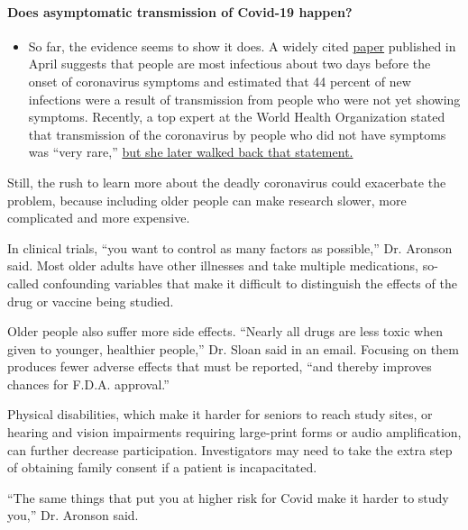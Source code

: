 \begin{itemize}
{  \paragraph{Does asymptomatic transmission of Covid-19
  happen?}\label{does-asymptomatic-transmission-of-covid-19-happen}}

  \begin{itemize}
  \tightlist
  \item
    So far, the evidence seems to show it does. A widely cited
    \href{https://www.nature.com/articles/s41591-020-0869-5}{paper}
    published in April suggests that people are most infectious about
    two days before the onset of coronavirus symptoms and estimated that
    44 percent of new infections were a result of transmission from
    people who were not yet showing symptoms. Recently, a top expert at
    the World Health Organization stated that transmission of the
    coronavirus by people who did not have symptoms was ``very rare,''
    \href{https://www.nytimes3xbfgragh.onion/2020/06/09/world/coronavirus-updates.html?action=click\&pgtype=Article\&state=default\&region=MAIN_CONTENT_3\&context=storylines_faq\#link-1f302e21}{but
    she later walked back that statement.}
  \end{itemize}
\end{itemize}

Still, the rush to learn more about the deadly coronavirus could
exacerbate the problem, because including older people can make research
slower, more complicated and more expensive.

In clinical trials, ``you want to control as many factors as possible,''
Dr. Aronson said. Most older adults have other illnesses and take
multiple medications, so-called confounding variables that make it
difficult to distinguish the effects of the drug or vaccine being
studied.

Older people also suffer more side effects. ``Nearly all drugs are less
toxic when given to younger, healthier people,'' Dr. Sloan said in an
email. Focusing on them produces fewer adverse effects that must be
reported, ``and thereby improves chances for F.D.A. approval.''

Physical disabilities, which make it harder for seniors to reach study
sites, or hearing and vision impairments requiring large-print forms or
audio amplification, can further decrease participation. Investigators
may need to take the extra step of obtaining family consent if a patient
is incapacitated.

``The same things that put you at higher risk for Covid make it harder
to study you,'' Dr. Aronson said.

